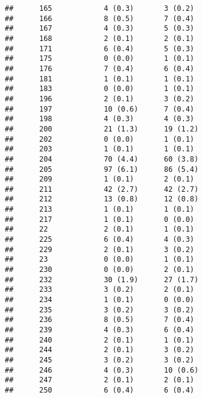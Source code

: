 \documentclass[]{article}
\begin{document}
\begin{verbatim}
##      165            4 (0.3)       3 (0.2)                       
##      166            8 (0.5)       7 (0.4)                       
##      167            4 (0.3)       5 (0.3)                       
##      168            2 (0.1)       2 (0.1)                       
##      171            6 (0.4)       5 (0.3)                       
##      175            0 (0.0)       1 (0.1)                       
##      176            7 (0.4)       6 (0.4)                       
##      181            1 (0.1)       1 (0.1)                       
##      183            0 (0.0)       1 (0.1)                       
##      196            2 (0.1)       3 (0.2)                       
##      197            10 (0.6)      7 (0.4)                       
##      198            4 (0.3)       4 (0.3)                       
##      200            21 (1.3)      19 (1.2)                      
##      202            0 (0.0)       1 (0.1)                       
##      203            1 (0.1)       1 (0.1)                       
##      204            70 (4.4)      60 (3.8)                      
##      205            97 (6.1)      86 (5.4)                      
##      209            1 (0.1)       2 (0.1)                       
##      211            42 (2.7)      42 (2.7)                      
##      212            13 (0.8)      12 (0.8)                      
##      213            1 (0.1)       1 (0.1)                       
##      217            1 (0.1)       0 (0.0)                       
##      22             2 (0.1)       1 (0.1)                       
##      225            6 (0.4)       4 (0.3)                       
##      229            2 (0.1)       3 (0.2)                       
##      23             0 (0.0)       1 (0.1)                       
##      230            0 (0.0)       2 (0.1)                       
##      232            30 (1.9)      27 (1.7)                      
##      233            3 (0.2)       2 (0.1)                       
##      234            1 (0.1)       0 (0.0)                       
##      235            3 (0.2)       3 (0.2)                       
##      236            8 (0.5)       7 (0.4)                       
##      239            4 (0.3)       6 (0.4)                       
##      240            2 (0.1)       1 (0.1)                       
##      244            2 (0.1)       3 (0.2)                       
##      245            3 (0.2)       3 (0.2)                       
##      246            4 (0.3)       10 (0.6)                      
##      247            2 (0.1)       2 (0.1)                       
##      250            6 (0.4)       6 (0.4)                       

\end{verbatim}
\end{document}
